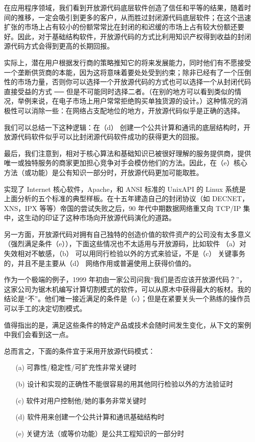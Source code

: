 在应用程序领域，我们看到开放源代码底层软件创造了信任和平等的结果，随着时间的推移，一定会吸引到更多的客户，从而胜过封闭源代码底层软件；在这个迅速扩张的市场上占有较小的份额常常比在封闭的和迟缓的市场上占有较大份额还要好。因此，对于基础结构软件，开放源代码的方式比利用知识产权得到收益的封闭源代码方式会得到更高的长期回报。


实际上，潜在用户根据发行商的策略推知它的将来发展能力，同时他们有不愿接受一个垄断供货商的本能，因为这将意味着要处处受到约束；除非已经有了一个压倒性的市场力量，否则你可以选择一个开放源代码的方式也可以选择一个从封闭代码直接受益的方式 ── 但是不可能同时选择二者。（在别的地方可以看到类似的情况，举例来说，在电子市场上用户常常拒绝购买单独货源的设计。）这种情况的消极性可以消除一些：在网络占支配地位的地方，开放源代码似乎是正确的选择。


我们可以总结一下这种逻辑：在（d） 创建一个公共计算和通讯的底层结构时，开放源代码软件似乎可以比封闭源代码软件成功的获得更大的回报。


最后，我们注意到，相对于核心算法和基础知识已被很好理解的服务提供商，提供唯一或独特服务的商家更加担心竞争对手会模仿他们的方法。因此，在（e）核心方法（或功能）是公有知识一部分时，开放源代码更加可能取胜。


实现了 Internet 核心软件，Apache，和 ANSI 标准的 UnixAPI 的 Linux 系统是上面分析的五个标准的典型样板。在十五年建造自己的封闭协议（如 DECNET，XNS，IPX 等等）帝国的尝试失败之后，90 年代中期数据网络重又向 TCP/IP 集中，这生动的印证了这种市场向开放源代码演化的道路。


另一方面，开放源代码对拥有自己独特的创造价值的软件资产的公司没有太多意义（强烈满足条件（e）），下面这些情况也不太适用与开放源码，比如软件 （a）对失效相对不敏感，（b） 可以用同行检验以外的方式来验证，不是（c） 关键事务的，并且不是主要从（d） 网络作用或普遍使用上获得价值的。


作为一个极端的例子，1999 年初由一家公司问我“我们是否应该开放源代码？”，这家公司为锯木机编写计算切割模式的软件，可以从原木中获得最大的板材。我的结论是“不”。他们唯一接近满足的条件是（c）；但是在紧要关头一个熟练的操作员可以手工的决定切割模式。


值得指出的是，满足这些条件的特定产品或技术会随时间发生变化，从下文的案例中我们会看到这一点。


总而言之，下面的条件宜于采用开放源代码模式：

\begin{enumerate}
\item[(a)] 可靠性/稳定性/可扩充性非常关键时
\item[(b)] 设计和实现的正确性不能很容易的用其他同行检验以外的方法验证时
\item[(c)] 软件对用户控制他/她的事务非常关键时
\item[(d)] 软件用来创建一个公共计算和通讯基础结构时
\item[(e)] 关键方法（或等价功能）是公共工程知识的一部分时
\end{enumerate}

